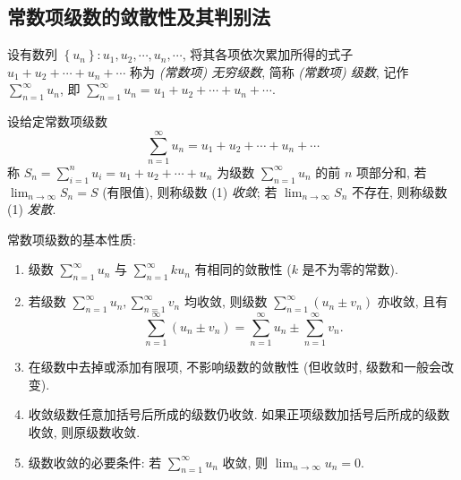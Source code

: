 \subsection{常数项级数的敛散性及其判别法}

\begin{definition}[常数项级数]
    设有数列 $ \left\{u_{n}\right\}: u_{1}, u_{2}, \cdots, u_{n}, \cdots $, 将其各项依次累加所得的式子 $ u_{1}+u_{2}+\cdots+u_{n}+\cdots$ 称为 \textit{(常数项) 无穷级数}, 简称 \textit{(常数项) 级数}, 记作 $\displaystyle \sum_{n=1}^{\infty} u_{n} $, 即 $\displaystyle \sum_{n=1}^{\infty} u_{n}=u_{1}+u_{2}+\cdots+   u_{n}+\cdots .$
\end{definition}

\begin{definition}[常数项级数收敛]
    设给定常数项级数
    \begin{equation}
        \sum_{n=1}^{\infty} u_{n}=u_{1}+u_{2}+\cdots+u_{n}+\cdots
        \tag{1}
    \end{equation}
    称 $\displaystyle S_{n}=\sum_{i=1}^{n} u_{i}=u_{1}+u_{2}+\cdots+u_{n} $ 为级数 $\displaystyle \sum_{n=1}^{\infty} u_{n} $ 的前 $ n $ 项部分和, 若 $\displaystyle \lim _{n \rightarrow \infty} S_{n}=S $ (有限值), 则称级数 (1) \textit{收敛}; 若 $\displaystyle \lim _{n \rightarrow \infty} S_{n} $ 不存在, 则称级数 (1) \textit{发散}.
\end{definition}

常数项级数的基本性质:
\begin{enumerate}[label=(\arabic{*})]
    \item 级数 $\displaystyle \sum_{n=1}^{\infty} u_{n} $ 与 $\displaystyle \sum_{n=1}^{\infty} k u_{n} $ 有相同的敛散性 ($k $ 是不为零的常数).
    \item 若级数 $\displaystyle \sum_{n=1}^{\infty} u_{n}, \sum_{n=1}^{\infty} v_{n} $ 均收敛, 则级数 $\displaystyle \sum_{n=1}^{\infty}\left(u_{n} \pm v_{n}\right) $ 亦收敛, 且有
          $$\sum_{n=1}^{\infty}\left(u_{n} \pm v_{n}\right)=\sum_{n=1}^{\infty} u_{n} \pm \sum_{n=1}^{\infty} v_{n} .$$
    \item 在级数中去掉或添加有限项, 不影响级数的敛散性 (但收敛时, 级数和一般会改变).
    \item 收敛级数任意加括号后所成的级数仍收敛. 如果正项级数加括号后所成的级数收敛, 则原级数收敛.
    \item 级数收敛的必要条件: 若 $\displaystyle \sum_{n=1}^{\infty} u_{n} $ 收敛, 则 $\displaystyle \lim _{n \rightarrow \infty} u_{n}=0 $.
\end{enumerate}

